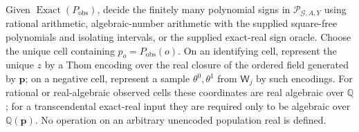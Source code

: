Given \(\operatorname{Exact}(P_{\mathrm{obs}})\), decide the finitely many polynomial signs in \(\mathscr P_{\mathcal G,A,Y}\) using rational arithmetic, algebraic-number arithmetic with the supplied square-free polynomials and isolating intervals, or the supplied exact-real sign oracle. Choose the unique cell containing \(p_o=P_{\mathrm{obs}}(o)\). On an identifying cell, represent the unique \(z\) by a Thom encoding over the real closure of the ordered field generated by \(\mathbf p\); on a negative cell, represent a sample \(\theta^0,\theta^1\) from \(\mathsf W_j\) by such encodings. For rational or real-algebraic observed cells these coordinates are real algebraic over \(\mathbb Q\); for a transcendental exact-real input they are required only to be algebraic over \(\mathbb Q(\mathbf p)\). No operation on an arbitrary unencoded population real is defined.